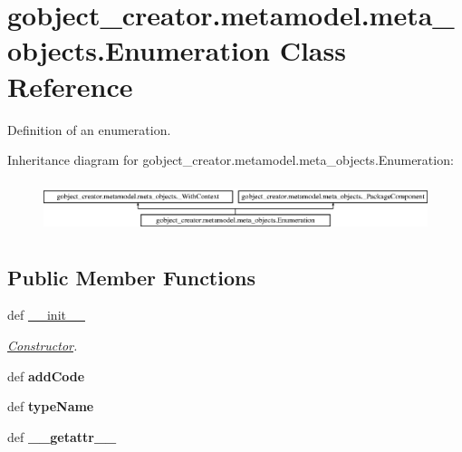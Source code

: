 \hypertarget{classgobject__creator_1_1metamodel_1_1meta__objects_1_1Enumeration}{
\section{gobject\_\-creator.metamodel.meta\_\-objects.Enumeration Class Reference}
\label{classgobject__creator_1_1metamodel_1_1meta__objects_1_1Enumeration}
}


Definition of an enumeration.  


Inheritance diagram for gobject\_\-creator.metamodel.meta\_\-objects.Enumeration:\begin{figure}[H]
\begin{center}
\leavevmode
\includegraphics[height=1.50538cm]{classgobject__creator_1_1metamodel_1_1meta__objects_1_1Enumeration}
\end{center}
\end{figure}
\subsection*{Public Member Functions}
\begin{DoxyCompactItemize}
\item 
def \hyperlink{classgobject__creator_1_1metamodel_1_1meta__objects_1_1Enumeration_a27e023ebbfbbdb4858a8fbcf92641b6e}{\_\-\_\-init\_\-\_\-}
\begin{DoxyCompactList}\small\item\em \hyperlink{classgobject__creator_1_1metamodel_1_1meta__objects_1_1Constructor}{Constructor}. \item\end{DoxyCompactList}\item 
\hypertarget{classgobject__creator_1_1metamodel_1_1meta__objects_1_1Enumeration_a396d92c72abf81236ebd73a653ccdc84}{
def {\bfseries addCode}}
\label{classgobject__creator_1_1metamodel_1_1meta__objects_1_1Enumeration_a396d92c72abf81236ebd73a653ccdc84}

\item 
\hypertarget{classgobject__creator_1_1metamodel_1_1meta__objects_1_1Enumeration_a533bc94629cb09562c2867e8d66766aa}{
def {\bfseries typeName}}
\label{classgobject__creator_1_1metamodel_1_1meta__objects_1_1Enumeration_a533bc94629cb09562c2867e8d66766aa}

\item 
\hypertarget{classgobject__creator_1_1metamodel_1_1meta__objects_1_1Enumeration_a92e507adb92b054f9501501797278ba5}{
def {\bfseries \_\-\_\-getattr\_\-\_\-}}
\label{classgobject__creator_1_1metamodel_1_1meta__objects_1_1Enumeration_a92e507adb92b054f9501501797278ba5}

\end{DoxyCompactItemize}
